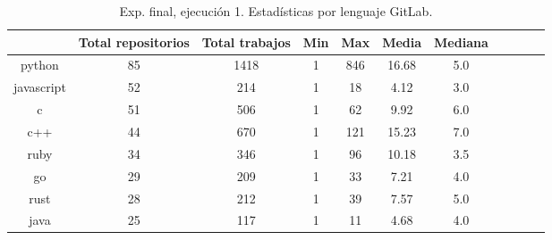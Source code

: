 \begin{table}
  \centering
  \caption{Exp. final, ejecución 1. Estadísticas por lenguaje GitLab.}
  \label{tab:tabla_f1_8}

\begin{footnotesize}
\renewcommand{\arraystretch}{1.5} %
\begin{tabular}{ccccccccccc}
  \hline
  {} &  Total repositorios &  Total trabajos &  Min &  Max &  Media &  Mediana \\
  \hline
  python           &         85 &        1418 &    1 &  846 &  16.68 &      5.0 \\
  javascript       &         52 &         214 &    1 &   18 &   4.12 &      3.0 \\
  c                &         51 &         506 &    1 &   62 &   9.92 &      6.0 \\
  c++              &         44 &         670 &    1 &  121 &  15.23 &      7.0 \\
  ruby             &         34 &         346 &    1 &   96 &  10.18 &      3.5 \\
  go               &         29 &         209 &    1 &   33 &   7.21 &      4.0 \\
  rust             &         28 &         212 &    1 &   39 &   7.57 &      5.0 \\
  java             &         25 &         117 &    1 &   11 &   4.68 &      4.0 \\

\end{tabular}
\end{footnotesize}
\end{table}
